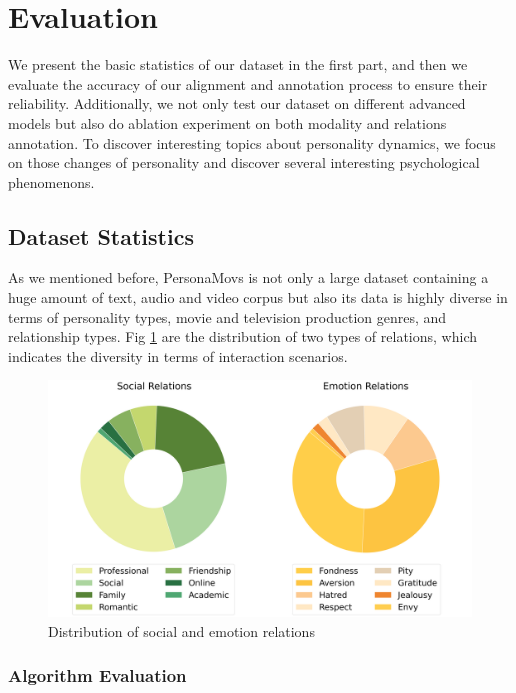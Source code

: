 \section{Evaluation}
 We present the basic statistics of our dataset in the first part, and then we evaluate the accuracy of our alignment and annotation process to ensure their reliability. Additionally, we not only test our dataset on different advanced models but also do ablation experiment on both modality and relations annotation. To discover interesting topics about personality dynamics, we focus on those changes of personality and discover several interesting psychological phenomenons.

\subsection{Dataset Statistics}

As we mentioned before, PersonaMovs is not only a large dataset containing a huge amount of text, audio and video corpus but also its data is highly diverse in terms of personality types, movie and television production genres, and relationship types. Fig \ref{Fig:Relats} are the distribution of two types of relations, which indicates the diversity in terms of interaction scenarios.

\begin{figure}[ht]
    \centering
    \includegraphics[width=0.75\linewidth]{images/relations.png}
    \caption{Distribution of social and emotion relations}
    \label{Fig:Relats}
\end{figure}


\subsubsection{Algorithm Evaluation}

